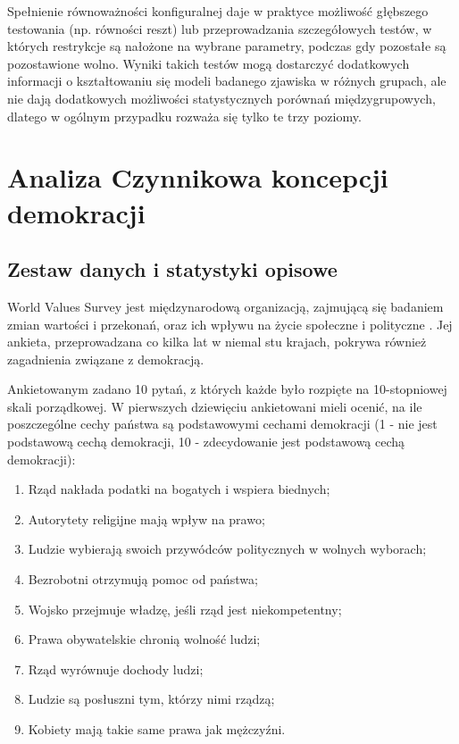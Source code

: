 \documentclass[12pt]{article}
\providecommand{\tightlist}{%
  \setlength{\itemsep}{0pt}\setlength{\parskip}{0pt}}
\begin{document}
Spełnienie równoważności konfiguralnej daje w praktyce możliwość głębszego testowania (np. równości reszt) lub przeprowadzania szczegółowych testów, w których restrykcje są nałożone na wybrane parametry, podczas gdy pozostałe są pozostawione wolno. Wyniki takich testów mogą dostarczyć dodatkowych informacji o kształtowaniu się modeli badanego zjawiska w różnych grupach, ale nie dają dodatkowych możliwości statystycznych porównań międzygrupowych, dlatego w ogólnym przypadku rozważa się tylko te trzy poziomy.

\hypertarget{analiza-czynnikowa-koncepcji-demokracji}{%
\section{Analiza Czynnikowa koncepcji demokracji}\label{analiza-czynnikowa-koncepcji-demokracji}}

\hypertarget{zestaw-danych-i-statystyki-opisowe}{%
\subsection{Zestaw danych i statystyki opisowe}\label{zestaw-danych-i-statystyki-opisowe}}

World Values Survey jest międzynarodową organizacją, zajmującą się badaniem zmian wartości i przekonań, oraz ich wpływu na życie społeczne i polityczne \citep{WVSData}. Jej ankieta, przeprowadzana co kilka lat w niemal stu krajach, pokrywa również zagadnienia związane z demokracją.

Ankietowanym zadano 10 pytań, z których każde było rozpięte na 10-stopniowej skali porządkowej. W pierwszych dziewięciu ankietowani mieli ocenić, na ile poszczególne cechy państwa są podstawowymi cechami demokracji (1 - nie jest podstawową cechą demokracji, 10 - zdecydowanie jest podstawową cechą demokracji):

\begin{enumerate}
\def\labelenumi{\arabic{enumi}.}
\tightlist
\item
  Rząd nakłada podatki na bogatych i wspiera biednych;
\item
  Autorytety religijne mają wpływ na prawo;
\item
  Ludzie wybierają swoich przywódców politycznych w wolnych wyborach;
\item
  Bezrobotni otrzymują pomoc od państwa;
\item
  Wojsko przejmuje władzę, jeśli rząd jest niekompetentny;
\item
  Prawa obywatelskie chronią wolność ludzi;
\item
  Rząd wyrównuje dochody ludzi;
\item
  Ludzie są posłuszni tym, którzy nimi rządzą;
\item
  Kobiety mają takie same prawa jak mężczyźni.
\end{enumerate}
\end{document}
